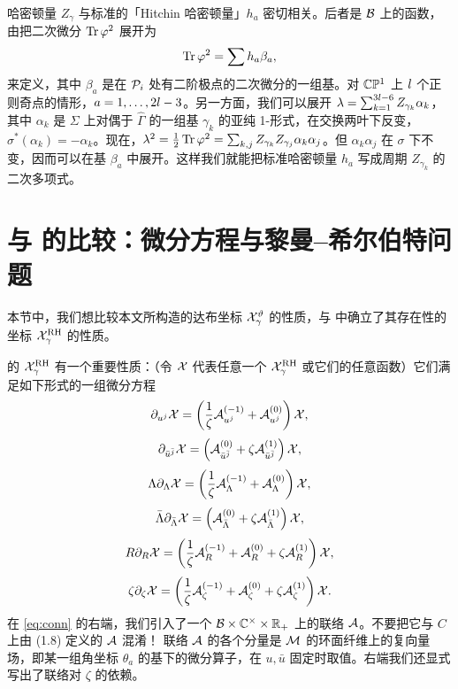哈密顿量 $Z_\gamma$ 与标准的「Hitchin 哈密顿量」$h_a$ 密切相关。后者是 $\mathcal{B}$ 上的函数，由把二次微分 $\operatorname{Tr}\varphi^2$ 展开为
\begin{equation}
\operatorname{Tr}\varphi^2 = \sum h_a\beta_a,
\end{equation}
来定义，其中 $\beta_a$ 是在 $\mathcal{P}_i$ 处有二阶极点的二次微分的一组基。对 $\mathbb{C}\mathbb{P}^1$ 上 $l$ 个正则奇点的情形，$a=1,\dots,2l-3$。另一方面，我们可以展开 $\lambda=\sum_{k=1}^{3l-6}Z_{\gamma_k}\alpha_k$，其中 $\alpha_k$ 是 $\Sigma$ 上对偶于 $\hat\Gamma$ 的一组基 $\gamma_k$ 的亚纯 1-形式，在交换两叶下反变，$\sigma^*(\alpha_k)=-\alpha_k$。现在，$\lambda^2=\tfrac{1}{2}\operatorname{Tr}\varphi^2=\sum_{k,j}Z_{\gamma_k}Z_{\gamma_j}\alpha_k\alpha_j$。但 $\alpha_k\alpha_j$ 在 $\sigma$ 下不变，因而可以在基 $\beta_a$ 中展开。这样我们就能把标准哈密顿量 $h_a$ 写成周期 $Z_{\gamma_k}$ 的二次多项式。

\section{与 \texorpdfstring{\cite{Gaiotto:2008cd}}{[1]} 的比较：微分方程与黎曼--希尔伯特问题} \label{sec:comparison}

本节中，我们想比较本文所构造的达布坐标 $\mathcal{X}_\gamma^\vartheta$ 的性质，与 \cite{Gaiotto:2008cd} 中确立了其存在性的坐标 $\mathcal{X}^{\rm RH}_\gamma$ 的性质。

\cite{Gaiotto:2008cd} 的 $\mathcal{X}_\gamma^{\rm RH}$ 有一个重要性质：（令 $\mathcal{X}$ 代表任意一个 $\mathcal{X}_\gamma^{\rm RH}$ 或它们的任意函数）它们满足如下形式的一组微分方程
\begin{equation}\label{eq:conn}
\partial_{u^j}\mathcal{X} = \left(\frac{1}{\zeta}\mathcal{A}^{(-1)}_{u^j} + \mathcal{A}^{(0)}_{u^j}\right)\mathcal{X},
\end{equation}
\begin{equation}
\partial_{\bar u^{\bar j}}\mathcal{X} = \left(\mathcal{A}^{(0)}_{\bar u^{\bar j}} + \zeta\mathcal{A}^{(1)}_{\bar u^{\bar j}}\right)\mathcal{X},
\end{equation}
\begin{equation}
\Lambda\partial_\Lambda\mathcal{X} = \left(\frac{1}{\zeta}\mathcal{A}^{(-1)}_\Lambda + \mathcal{A}^{(0)}_\Lambda\right)\mathcal{X},
\end{equation}
\begin{equation}
\bar\Lambda\partial_{\bar\Lambda}\mathcal{X} = \left(\mathcal{A}^{(0)}_{\bar\Lambda} + \zeta\mathcal{A}^{(1)}_{\bar\Lambda}\right)\mathcal{X},
\end{equation}
\begin{equation}
R\partial_R\mathcal{X} = \left(\frac{1}{\zeta}\mathcal{A}^{(-1)}_R + \mathcal{A}^{(0)}_R + \zeta\mathcal{A}^{(1)}_R\right)\mathcal{X},
\end{equation}
\begin{equation}\label{eq:zetaeq}
\zeta\partial_\zeta\mathcal{X} = \left(\frac{1}{\zeta}\mathcal{A}^{(-1)}_\zeta + \mathcal{A}^{(0)}_\zeta + \zeta\mathcal{A}^{(1)}_\zeta\right)\mathcal{X}.
\end{equation}
在 \eqref{eq:conn} 的右端，我们引入了一个 $\mathcal{B}\times\mathbb{C}^\times\times\mathbb{R}_+$ 上的联络 $\mathcal{A}$。不要把它与 $C$ 上由 (1.8) 定义的 $\mathcal{A}$ 混淆！%
联络 $\mathcal{A}$ 的各个分量是 $\mathcal{M}$ 的环面纤维上的复向量场，即某一组角坐标 $\theta_a$ 的基下的微分算子，在 $u,\bar u$ 固定时取值。右端我们还显式写出了联络对 $\zeta$ 的依赖。

